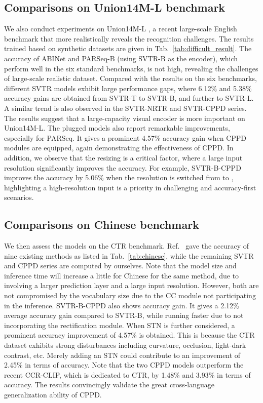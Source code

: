 \documentclass[10pt,journal,compsoc]{IEEEtran}
\begin{document}
\subsection{Comparisons on Union14M-L benchmark}
We also conduct experiments on Union14M-L \cite{jiang2023revisiting}, a recent large-scale English benchmark that more realistically reveals the recognition challenges. The results trained based on synthetic datasets are given in Tab.~\ref{tab:difficult_result}. The accuracy of ABINet and PARSeq-B (using SVTR-B as the encoder), which perform well in the six standard benchmarks, is not high, revealing the challenges of large-scale realistic dataset. Compared with the results on the six benchmarks, different SVTR models exhibit large performance gaps, where 6.12\% and 5.38\% accuracy gains are obtained from SVTR-T to SVTR-B, and further to SVTR-L. A similar trend is also observed in the SVTR-NRTR and SVTR-CPPD series. The results suggest that a large-capacity visual encoder is more important on Union14M-L. The plugged models also report remarkable improvements, especially for PARSeq. It gives a prominent 4.57\% accuracy gain when CPPD modules are equipped, again demonstrating the effectiveness of CPPD. In addition, we observe that the resizing is a critical factor, where a large input resolution significantly improves the accuracy. For example, SVTR-B-CPPD improves the accuracy by 5.06\% when the resolution is switched from  to , highlighting a high-resolution input is a priority in challenging and accuracy-first scenarios.

\subsection{Comparisons on Chinese benchmark}
We then assess the models on the CTR benchmark. Ref.~\cite{yuICCV2023clipctr} gave the accuracy of nine existing methods as listed in Tab.~\ref{tab:chinese}, while the remaining SVTR and CPPD series are computed by ourselves. Note that the model size and inference time will increase a little for Chinese for the same method, due to involving a larger prediction layer and a large input resolution. However, both are not compromised by the vocabulary size due to the CC module not participating in the inference. SVTR-B-CPPD also shows accuracy gain. It gives a 2.12\% average accuracy gain compared to SVTR-B, while running faster due to not incorporating the rectification module. When STN is further considered, a prominent accuracy improvement of 4.57\% is obtained. This is because the CTR dataset exhibits strong disturbances including curvature, occlusion, light-dark contrast, etc. Merely adding an STN could contribute to an improvement of 2.45\% in terms of accuracy. Note that the two CPPD models outperform the recent CCR-CLIP, which is dedicated to CTR, by 1.48\% and 3.93\% in terms of accuracy. The results convincingly validate the great cross-language generalization ability of CPPD. 
\end{document}

